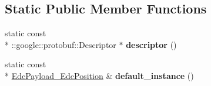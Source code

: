 \subsection*{Static Public Member Functions}
\begin{DoxyCompactItemize}
\item 
\hypertarget{classedcdatatypes_1_1_edc_payload___edc_position_a7379605d89e74e500a4bae9fccdc097e}{static const \\*
\-::google\-::protobuf\-::\-Descriptor $\ast$ {\bfseries descriptor} ()}\label{classedcdatatypes_1_1_edc_payload___edc_position_a7379605d89e74e500a4bae9fccdc097e}

\item 
\hypertarget{classedcdatatypes_1_1_edc_payload___edc_position_a664ed348e09018e5e85d8c899d322547}{static const \\*
\hyperlink{classedcdatatypes_1_1_edc_payload___edc_position}{Edc\-Payload\-\_\-\-Edc\-Position} \& {\bfseries default\-\_\-instance} ()}\label{classedcdatatypes_1_1_edc_payload___edc_position_a664ed348e09018e5e85d8c899d322547}

\end{DoxyCompactItemize}
